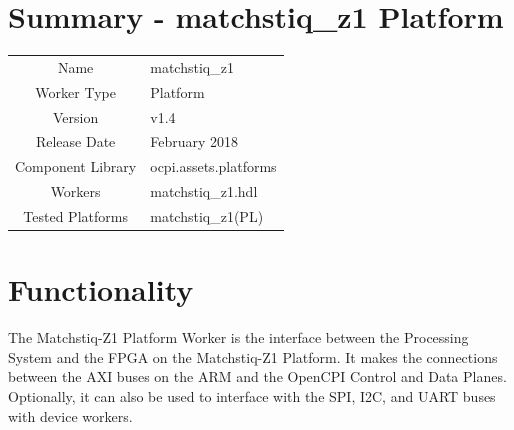 \documentclass{article}
\author{} %
\date{Version \docVersion} %
\title{\docTitle}
\def\docVersion{1.4}
\def\comp{matchstiq\_z1}
\def\Comp{matchstiq\_z1 Platform}
\begin{document}
\section*{Summary - \Comp}
\begin{tabular}{|c|M{13.5cm}|}
	\hline
	                  &                                                    \\
	\hline
	Name              & \comp                                              \\
	\hline
	Worker Type       & Platform                                           \\
	\hline
	Version           & v\docVersion \\
	\hline
	Release Date      & February 2018 \\
	\hline
	Component Library & ocpi.assets.platforms \\
	\hline
	Workers & \comp.hdl \\
	\hline
	Tested Platforms  & matchstiq\_z1(PL) \\
	\hline
\end{tabular}

\section*{Functionality}
\begin{flushleft}
The Matchstiq-Z1 Platform Worker is the interface between the Processing System and the FPGA on the Matchstiq-Z1 Platform. It makes the connections between the AXI buses on the ARM and the OpenCPI Control and Data Planes. Optionally, it can also be used to interface with the SPI, I2C, and UART buses with device workers.
\end{flushleft}
\end{document}
